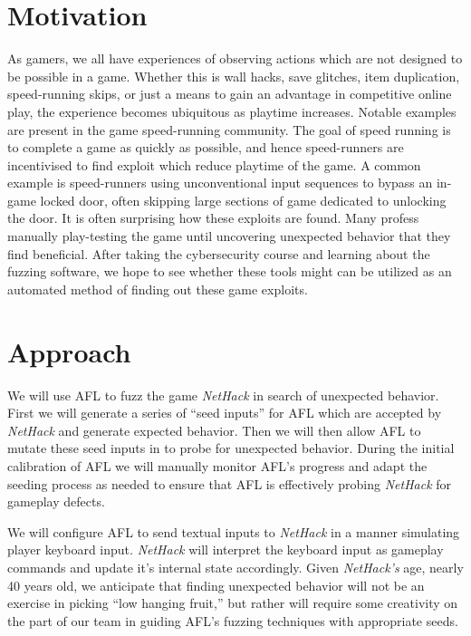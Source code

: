 \documentclass[12pt]{diazessay}
\begin{document}


\section*{Motivation}

As gamers, we all have experiences of observing actions which are not designed to be possible in a game.
Whether this is wall hacks, save glitches, item duplication, speed-running skips, or just a means to gain an advantage in competitive online play, the experience becomes ubiquitous as playtime increases.
Notable examples are present in the game speed-running\cite{SpeedRunning} community.
The goal of speed running is to complete a game as quickly as possible, and hence speed-runners are incentivised to find exploit which reduce playtime of the game.
A common example is speed-runners using unconventional input sequences to bypass an in-game locked door, often skipping\cite{SequenceBreaking} large sections of game dedicated to unlocking the door.
It is often surprising how these exploits are found.
Many profess manually play-testing the game until uncovering unexpected behavior that they find beneficial.
After taking the cybersecurity course and learning about the fuzzing software, we hope to see whether these tools might can be utilized as an automated method of finding out these game exploits.


\section*{Approach}

We will use AFL to fuzz the game \emph{NetHack} in search of unexpected behavior.
First we will generate a series of ``seed inputs'' for AFL which are accepted by \emph{NetHack} and generate expected behavior.
Then we will then allow AFL to mutate these seed inputs \cite{Seed} in to probe for unexpected behavior.
During the initial calibration of AFL we will manually monitor AFL's progress and adapt the seeding process as needed to ensure that AFL is effectively probing \emph{NetHack} for gameplay defects.

We will configure AFL to send textual inputs to \emph{NetHack} in a manner simulating player keyboard input.
\emph{NetHack} will interpret the keyboard input as gameplay commands and update it's internal state accordingly.
Given \emph{NetHack's} age, nearly 40 years old, we anticipate that finding unexpected behavior will not be an exercise in picking ``low hanging fruit,'' but rather will require some creativity on the part of our team in guiding AFL's fuzzing techniques \cite{FuzzingTechnic} with appropriate seeds.
\end{document}
